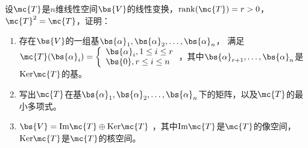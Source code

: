 \documentclass[12pt, a4paper, oneside, UTF8]{ctexbook}
\begin{document}
\begin{question}
    设$\mc{T}$是$n$维线性空间$\bs{V}$的线性变换，$\mathrm{rank}(\mc{T})=r>0$，$\mc{T}^2=\mc{T}$，证明：
    \begin{enumerate}[label=(\arabic{*})]
        \item 存在$\bs{V}$的一组基$\bs{\alpha}_1,\bs{\alpha}_2,\ldots,\bs{\alpha}_n$，
        满足$\mc{T}(\bs{\alpha}_i)=\left\{
            \begin{array}{ll}
                \bs{\alpha}_i,1\leq i\leq r\\
                \bs{0},r \leq i \leq n
            \end{array}
            \right.$，其中$\bs{\alpha}_{r+1},\ldots,\bs{\alpha}_n$是$\mathrm{Ker}\mc{T}$的基。
        \item 写出$\mc{T}$在基$\bs{\alpha}_1,\bs{\alpha}_2,\ldots,\bs{\alpha}_n$下的矩阵，以及$\mc{T}$的最小多项式。
    \item $\bs{V}=\mathrm{Im}\mc{T}\oplus \mathrm{Ker}\mc{T}$
，其中$\mathrm{Im}\mc{T}$是$\mc{T}$的像空间，$\mathrm{Ker}\mc{T}$是$\mc{T}$的核空间。
    \end{enumerate}
\end{question}
\end{document}
